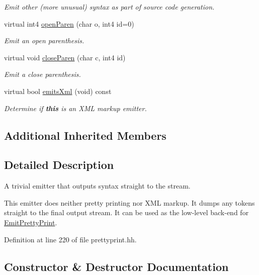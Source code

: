 \begin{DoxyCompactItemize}
\begin{DoxyCompactList}\small\item\em Emit other (more unusual) syntax as part of source code generation. \end{DoxyCompactList}\item 
virtual int4 \mbox{\hyperlink{class_emit_no_xml_a9a41693087659b738ccdeadaa16d886b}{open\+Paren}} (char o, int4 id=0)
\begin{DoxyCompactList}\small\item\em Emit an open parenthesis. \end{DoxyCompactList}\item 
virtual void \mbox{\hyperlink{class_emit_no_xml_a7554f4a6b9b246c34a3c4febd99c740c}{close\+Paren}} (char c, int4 id)
\begin{DoxyCompactList}\small\item\em Emit a close parenthesis. \end{DoxyCompactList}\item 
virtual bool \mbox{\hyperlink{class_emit_no_xml_a9344bd2b72587387d09737738b5fe05f}{emits\+Xml}} (void) const
\begin{DoxyCompactList}\small\item\em Determine if {\bfseries{this}} is an X\+ML markup emitter. \end{DoxyCompactList}\end{DoxyCompactItemize}
\subsection*{Additional Inherited Members}


\subsection{Detailed Description}
A trivial emitter that outputs syntax straight to the stream. 

This emitter does neither pretty printing nor X\+ML markup. It dumps any tokens straight to the final output stream. It can be used as the low-\/level back-\/end for \mbox{\hyperlink{class_emit_pretty_print}{Emit\+Pretty\+Print}}. 

Definition at line 220 of file prettyprint.\+hh.



\subsection{Constructor \& Destructor Documentation}
\mbox{\label{class_emit_no_xml_a0bc089362a21d7234adc86a101b392d6}} 
